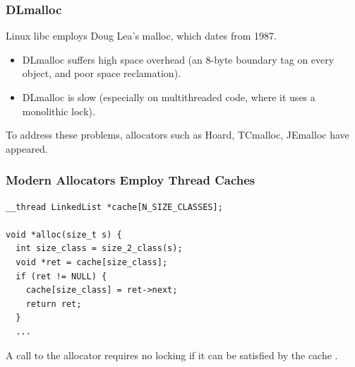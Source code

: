 \documentclass[xcolor=dvipsnames,14pt]{beamer}
\begin{document}
\begin{frame}
\frametitle{DLmalloc}

\hfill{}\hspace{1in}

Linux libc employs Doug Lea's malloc, which dates from 1987.

\begin{itemize}
\item DLmalloc suffers high space overhead (an 8-byte boundary tag on every object, and poor space reclamation).
\item DLmalloc is slow (especially on multithreaded code, where it uses a monolithic lock).
\end{itemize}

To address these problems, allocators such as Hoard, TCmalloc, JEmalloc have appeared.

\end{frame}

\begin{frame}[fragile]
\frametitle{Modern Allocators Employ Thread Caches}

\begin{verbatim}
__thread LinkedList *cache[N_SIZE_CLASSES];

void *alloc(size_t s) {
  int size_class = size_2_class(s);
  void *ret = cache[size_class];
  if (ret != NULL) {
    cache[size_class] = ret->next;
    return ret;
  }
  ...
\end{verbatim}

A call to the allocator requires no locking if it can be satisfied by the cache .
\end{frame}
\end{document}
